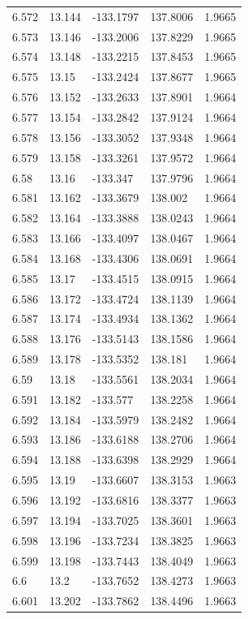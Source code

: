 \begin{tabular}{lllll}
6.572 & 13.144 & -133.1797 & 137.8006 & 1.9665 \\
6.573 & 13.146 & -133.2006 & 137.8229 & 1.9665 \\
6.574 & 13.148 & -133.2215 & 137.8453 & 1.9665 \\
6.575 & 13.15 & -133.2424 & 137.8677 & 1.9665 \\
6.576 & 13.152 & -133.2633 & 137.8901 & 1.9664 \\
6.577 & 13.154 & -133.2842 & 137.9124 & 1.9664 \\
6.578 & 13.156 & -133.3052 & 137.9348 & 1.9664 \\
6.579 & 13.158 & -133.3261 & 137.9572 & 1.9664 \\
6.58 & 13.16 & -133.347 & 137.9796 & 1.9664 \\
6.581 & 13.162 & -133.3679 & 138.002 & 1.9664 \\
6.582 & 13.164 & -133.3888 & 138.0243 & 1.9664 \\
6.583 & 13.166 & -133.4097 & 138.0467 & 1.9664 \\
6.584 & 13.168 & -133.4306 & 138.0691 & 1.9664 \\
6.585 & 13.17 & -133.4515 & 138.0915 & 1.9664 \\
6.586 & 13.172 & -133.4724 & 138.1139 & 1.9664 \\
6.587 & 13.174 & -133.4934 & 138.1362 & 1.9664 \\
6.588 & 13.176 & -133.5143 & 138.1586 & 1.9664 \\
6.589 & 13.178 & -133.5352 & 138.181 & 1.9664 \\
6.59 & 13.18 & -133.5561 & 138.2034 & 1.9664 \\
6.591 & 13.182 & -133.577 & 138.2258 & 1.9664 \\
6.592 & 13.184 & -133.5979 & 138.2482 & 1.9664 \\
6.593 & 13.186 & -133.6188 & 138.2706 & 1.9664 \\
6.594 & 13.188 & -133.6398 & 138.2929 & 1.9664 \\
6.595 & 13.19 & -133.6607 & 138.3153 & 1.9663 \\
6.596 & 13.192 & -133.6816 & 138.3377 & 1.9663 \\
6.597 & 13.194 & -133.7025 & 138.3601 & 1.9663 \\
6.598 & 13.196 & -133.7234 & 138.3825 & 1.9663 \\
6.599 & 13.198 & -133.7443 & 138.4049 & 1.9663 \\
6.6 & 13.2 & -133.7652 & 138.4273 & 1.9663 \\
6.601 & 13.202 & -133.7862 & 138.4496 & 1.9663 \\

\end{tabular}
